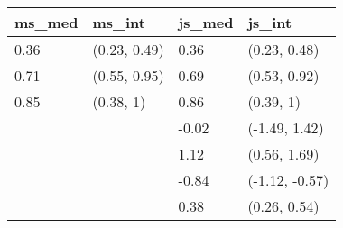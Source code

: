 
\begin{tabular}{llll}
\toprule
ms\_med & ms\_int & js\_med & js\_int\\
\midrule
0.36 & (0.23, 0.49) & 0.36 & (0.23, 0.48)\\
0.71 & (0.55, 0.95) & 0.69 & (0.53, 0.92)\\
0.85 & (0.38, 1) & 0.86 & (0.39, 1)\\
 &  & -0.02 & (-1.49, 1.42)\\
 &  & 1.12 & (0.56, 1.69)\\
 &  & -0.84 & (-1.12, -0.57)\\
 &  & 0.38 & (0.26, 0.54)\\
\bottomrule
\end{tabular}
